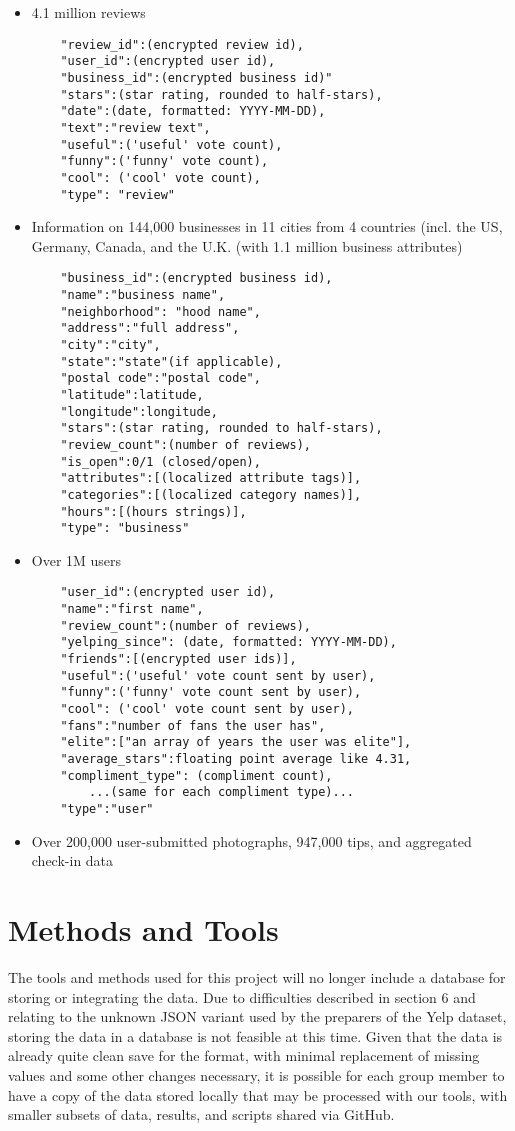 \begin{itemize}
	\item{4.1 million reviews}
	\begin{verbatim}
	"review_id":(encrypted review id),
	"user_id":(encrypted user id),
	"business_id":(encrypted business id)"
	"stars":(star rating, rounded to half-stars),
	"date":(date, formatted: YYYY-MM-DD),
	"text":"review text",
	"useful":('useful' vote count),
	"funny":('funny' vote count),
	"cool": ('cool' vote count),
	"type": "review"
	\end{verbatim}
	\item{Information on 144,000 businesses in 11 cities from 4 countries (incl. the US, Germany, Canada, and the U.K. (with 1.1 million business attributes)}
	\begin{verbatim}
	"business_id":(encrypted business id),
	"name":"business name",
	"neighborhood": "hood name",
	"address":"full address",
	"city":"city",
	"state":"state"(if applicable),
	"postal code":"postal code",
	"latitude":latitude,
	"longitude":longitude,
	"stars":(star rating, rounded to half-stars),
	"review_count":(number of reviews),
	"is_open":0/1 (closed/open),
	"attributes":[(localized attribute tags)],
	"categories":[(localized category names)],
	"hours":[(hours strings)],
	"type": "business"
	\end{verbatim}
	\item{Over 1M users}
	\begin{verbatim}
	"user_id":(encrypted user id),
	"name":"first name",
	"review_count":(number of reviews),
	"yelping_since": (date, formatted: YYYY-MM-DD),
	"friends":[(encrypted user ids)],
	"useful":('useful' vote count sent by user),
	"funny":('funny' vote count sent by user),
	"cool": ('cool' vote count sent by user),
	"fans":"number of fans the user has",
	"elite":["an array of years the user was elite"],
	"average_stars":floating point average like 4.31,
	"compliment_type": (compliment count),
		...(same for each compliment type)...
	"type":"user"
	\end{verbatim}
	\item{Over 200,000 user-submitted photographs, 947,000 tips, and aggregated check-in data}
\end{itemize}

\section{Methods and Tools}

\quad The tools and methods used for this project will no longer include a database for storing or integrating the data. Due to difficulties described in section 6 and relating to the unknown JSON variant used by the preparers of the Yelp dataset, storing the data in a database is not feasible at this time. Given that the data is already quite clean save for the format, with minimal replacement of missing values and some other changes necessary, it is possible for each group member to have a copy of the data stored locally that may be processed with our tools, with smaller subsets of data, results, and scripts shared via GitHub. 

